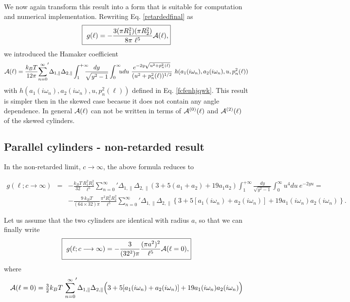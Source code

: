 \documentclass[onecolumn,letterpaper,amsmath,amssymb,floatfix,aps,superscriptaddress]{revtex4}
\begin{document}
We now again transform this result into a form that is suitable for computation and numerical implementation. Rewriting Eq. \ref{retardedfinal} as
\begin{equation}
  \fbox{
    $\displaystyle{
g(\ell) = - \frac{3 (\pi R_1^{2}) (\pi R_2^{2})}{8\pi~\ell^5} {\cal A}(\ell),}$}
\label{retardedfinal-a}
\end{equation}
we introduced the Hamaker coefficient
\begin{equation}
{\cal A}(\ell) = \frac{k_BT}{12 \pi} {\sum_{n=0}^{\infty}}' \Delta_{1,\parallel} \Delta_{2,\parallel} 
\int_{1}^{+\infty}\!\!\!\!\! \frac{dy}{\sqrt{y^2 - 1}} \int_0^{\infty}\!\!\!  u du ~\frac{e^{-2 y \sqrt{u^{2} + p_n^{2}(\ell)}}}{(u^{2} +p_n^{2}(\ell))^{1/2}} ~h(a_1(i \omega_n), a_2(i \omega_n), u, p_n^{2}(\ell))
\label{retardedfinal-b}
\end{equation}
with $h(a_1(i \omega_n), a_2(i \omega_n), u, p_n^{2}(\ell))$ defined in Eq. \ref{fcfenhjqwk}. This result is simpler then in the skewed case becasue it does not contain any angle dependence. In general ${\cal A}(\ell)$ can not be written in terms of ${\cal A}^{(0)}(\ell)$ and ${\cal A}^{(2)}(\ell)$ of the skewed cylinders.


\subsection{Parallel cylinders - non-retarded result}


In the non-retarded limit, $c \longrightarrow \infty$, the above formula  reduces to 
\begin{widetext}
\begin{eqnarray}
g(\ell; c \longrightarrow \infty) &=& - \frac{k_BT}{32} \frac{ R_1^{2} R_2^{2} }{\ell^5} {\sum_{n=0}^{\infty}}' \Delta_{1,\parallel} \Delta_{2,\parallel} 
\left( 3 + 5 (a_1+a_2) + 19 a_1 a_2 \right) \int_{1}^{+\infty}\!\!\!\!\! \frac{dy}{\sqrt{y^2 - 1}} \int_0^{\infty}\!\!\! u^4 du ~{e^{-2 y u }} = \nonumber\\
& & - \frac{9 ~k_BT}{(64 \times 32) \pi } \frac{\pi^2 R_1^{2} R_2^{2}}{\ell^5} {\sum_{n=0}^{\infty}}' \Delta_{1,\parallel} \Delta_{2,\parallel}
\left \{ 3 + 5 [ a_1(i \omega_n) + a_2(i \omega_n) ] + 19 a_1(i \omega_n) a_2(i \omega_n) \right \}.
\label{eq:cyl-paral-nonretarded}
\end{eqnarray}
\end{widetext}
Let us assume that the two cylinders are identical with radius $a$, so that we can finally write
\begin{equation}
  \fbox{
    $\displaystyle{
g(\ell; c \longrightarrow \infty) = - \frac{3}{(32^2) \pi } \frac{(\pi a^2)^{2}}{\ell^5} {\cal A}(\ell = 0),
\label{eq:cyl-paral-nonretarded-frq3}}$}
\end{equation}
where
\begin{equation}
{\cal A}(\ell = 0) = {\textstyle\frac32} {k_BT} ~ {\sum_{n=0}^{\infty}}' \Delta_{1,\parallel} \Delta_{2,\parallel}
\Big( 3 + 5 [ a_1(i \omega_n) + a_2(i \omega_n) ] + 19 a_1(i \omega_n) a_2(i \omega_n) \Big)
\label{eq:cyl-paral-nonretarded-frq3_A}
\end{equation}
\end{document}
